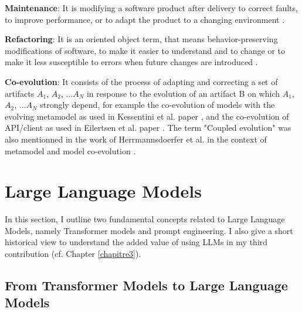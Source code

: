 \textbf{Maintenance}: It is modifying a software product after delivery to correct faults, to improve performance, or to adapt the product to a changing environment \cite{schneidewind1987state}.

\textbf{Refactoring}: It is an oriented object term, that means behavior-preserving modifications of software, to make it easier to understand and to change or to make it less susceptible to errors when future changes are introduced \cite{mens2004survey}. 

\textbf{Co-evolution}: It consists of the process of adapting and correcting a set of artifacts $A_1$, $A_2$, ...$A_N$ in response to the evolution of an artifact B on which $A_1$, $A_2$, ...$A_N$  strongly depend, for example the co-evolution of models with the evolving metamodel as used in Kessentini et al. paper \cite{Kessentini2016automated}, and the co-evolution of API/client as used in Eilertsen et al. paper \cite{8443581}. The term "Coupled evolution" was also mentionned in the work of Herrmannsdoerfer et al. in the context of metamodel and model co-evolution \cite{herrmannsdoerfer2009cope}.





\section{Large Language Models}
\label{llm}
In this section, I outline two fundamental concepts related to Large Language Models, namely Transformer models and prompt engineering. I also give a short historical view to understand the added value of using LLMs in my third contribution (cf. Chapter \ref{chapitre3}).


\subsection{From Transformer Models to Large Language Models}

